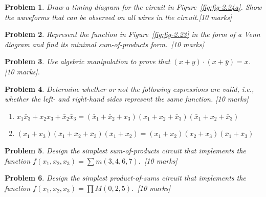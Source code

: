 \documentclass[twocolumn]{article}
\newtheorem{prob}{Problem}
\newcommand{\bx}{\bar{x}}
\begin{document}
\begin{prob}
Draw a timing diagram for the circuit in Figure~\ref{fig:fig-2.24a}. Show the waveforms that can be observed on all wires in the circuit.\cite[Prob 2.8]{brown2013fundamentals}[10 marks]
\end{prob}

\begin{prob}
Represent the function in Figure~\ref{fig:fig-2.23} in the form of a Venn diagram and find its minimal
sum-of-products form.~\cite[Prob 2.17]{brown2013fundamentals}[10 marks]
\end{prob}

\begin{prob}
Use algebric manipulation to prove that $(x+y)\cdot(x+\bar{y}) = x$. \cite[Prob 2.2]{brown2013fundamentals} [10 marks].
\end{prob}

\begin{prob}
Determine whether or not the following expressions are valid, i.e., whether the left- and
right-hand sides represent the same function.
\cite[Prob 2.7]{brown2013fundamentals}[10 marks]
\begin{enumerate}
    \item $x_1 \bx_3 + x_2 x_3 + \bx_2 \bx_3 = (\bx_1 + \bx_2 + x_3)(x_1 + x_2 + \bx_3)(\bx_1 + x_2 + \bx_3)$
    \item $(x_1 + x_3)(\bx_1 + \bx_2 + \bx_3)(\bx_1 + x_2) = (x_1 + x_2)(x_2 + x_3)(\bx_1 + \bx_3)$
\end{enumerate}
\end{prob}

\begin{prob}
Design the simplest sum-of-products circuit that implements the function $f (x_1 , x_2 , x_3 ) = \sum m(3, 4, 6, 7)$.~\cite[Prob 2.21]{brown2013fundamentals}[10 marks]
\end{prob}

\begin{prob}
Design the simplest product-of-sums circuit that implements the function $f (x_1 , x_2 , x_3 ) = \prod M (0, 2, 5)$.~\cite[Prob 2.22]{brown2013fundamentals}[10 marks]
\end{prob}




\end{document}
